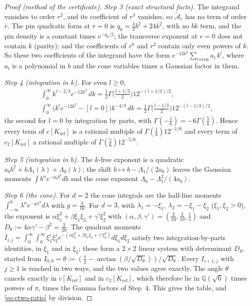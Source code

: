 \begin{proof}[Proof (method of the certificate)]
\emph{Step 3 (exact structural facts).} The integrand vanishes to order $r^2$, and its coefficient of $r^3$ vanishes, so $\widetilde{\mathcal A}_r$ has no term of order $r$. The pin quadratic form at $r=0$ is $q_0=\frac32b^2+24k^2$, with no $bk$ term, and the pin density is a constant times $e^{-q_0/2}$; the transverse exponent at $r=0$ does not contain $k$ (parity); and the coefficients of $r^0$ and $r^2$ contain only even powers of $k$. So these two coefficients of the integrand have the form $e^{-12k^2}\sum_{l\ \mathrm{even}}a_l\,k^l$, where $a_l$ is a polynomial in $b$ and the cone variables times a Gaussian factor in them.

\emph{Step 4 (integration in $k$).} For even $l\ge0$,
\begin{equation}\label{eq:ctwo-kint}
\begin{gathered}
\int_0^\infty k^{l-2/3}e^{-12k^2}\,dk=\tfrac12\Gamma\bigl(\tfrac{l+1/3}2\bigr)12^{-(l+1/3)/2},\\
\int_0^\infty\bigl(k^le^{-12k^2}-[l=0]\bigr)k^{-4/3}\,dk=\tfrac12\Gamma\bigl(\tfrac{l-1/3}2\bigr)12^{-(l-1/3)/2},
\end{gathered}
\end{equation}
the second for $l=0$ by integration by parts, with $\Gamma(-\frac16)=-6\Gamma(\frac56)$. Hence every term of $c[K_{\mathrm{ref}}]$ is a rational multiple of $\Gamma(\frac16)12^{-1/6}$ and every term of $c_2[K_{\mathrm{ref}}]$ a rational multiple of $\Gamma(\frac56)12^{-5/6}$.

\emph{Step 5 (integration in $b$).} The $k$-free exponent is a quadratic $a_bb^2+b\Lambda_1(\lambda)+\Lambda_0(\lambda)$; the shift $b\mapsto b-\Lambda_1/(2a_b)$ leaves the Gaussian moments $\int b^ne^{-a_bb^2}db$ and the cone exponent $\Lambda_0-\Lambda_1^2/(4a_b)$.

\emph{Step 6 (the cone).} For $d=2$ the cone integrals are the half-line moments $\int_{-\infty}^0\lambda^ne^{-g\lambda^2}d\lambda$ with $g=\frac3{16}$. For $d=3$, with $\lambda_1=-\xi_1$, $\lambda_2=-\xi_1-\xi_2$ ($\xi_1,\xi_2>0$), the exponent is $\alpha\xi_1^2+\beta\xi_1\xi_2+\gamma'\xi_2^2$ with $(\alpha,\beta,\gamma')=(\frac3{10},\frac3{10},\frac15)$ and $D_\theta:=4\alpha\gamma'-\beta^2=\frac3{20}$. The quadrant moments $I_{i,j}=\int_0^\infty\!\int_0^\infty\xi_1^i\xi_2^je^{-(\alpha\xi_1^2+\beta\xi_1\xi_2+\gamma'\xi_2^2)}d\xi_1d\xi_2$ satisfy two integration-by-parts identities, in $\xi_1$ and in $\xi_2$; these form a $2\times2$ linear system with determinant $D_\theta$, started from $I_{0,0}=\theta:=(\frac\pi2-\arctan(\beta/\sqrt{D_\theta}))/\sqrt{D_\theta}$. Every $I_{i+1,j}$ with $j\ge1$ is reached in two ways, and the two values agree exactly. The angle $\theta$ cancels exactly in $c[K_{\mathrm{ref}}]$ and in $c_2[K_{\mathrm{ref}}]$, which therefore lie in $\mathbb Q(\sqrt6)$ times powers of $\pi$, times the Gamma factors of Step~4. This gives the table, and \eqref{eq:ctwo-ratio} by division.


\end{proof}
